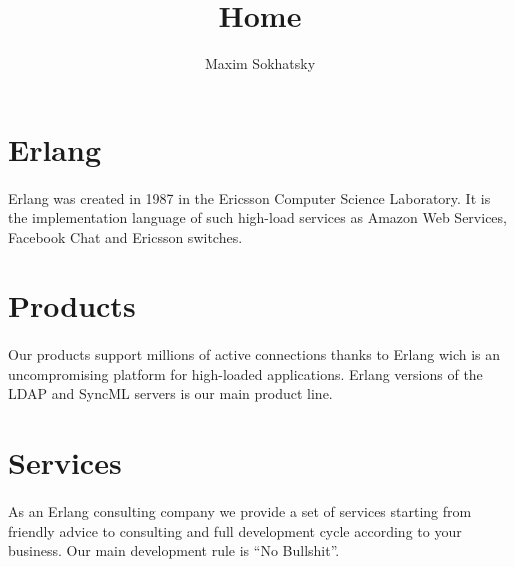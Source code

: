 \documentclass[11pt]{article}
\begin{document}
\title{Home}
\author{Maxim Sokhatsky}


\section*{Erlang}
\paragraph{}
Erlang was created in 1987 in the Ericsson Computer Science Laboratory.
It is the implementation language of such high-load services as Amazon Web Services,
Facebook Chat and Ericsson switches.


\section*{Products}
\paragraph{}
Our products support millions of active connections thanks to Erlang wich is
an uncompromising platform for high-loaded applications.
Erlang versions of the LDAP and SyncML servers is our main product line.

\section*{Services}
\paragraph{}
As an Erlang consulting company we provide a set of services starting from friendly advice to
consulting and full development cycle according to your business.
Our main development rule is ``No Bullshit''.
\end{document}
